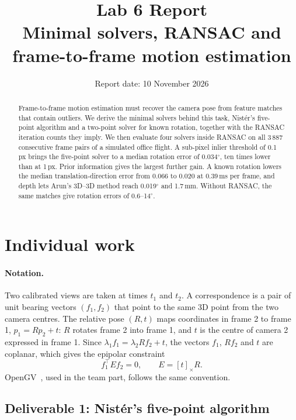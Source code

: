 \documentclass[11pt,a4paper]{article}
\title{Lab 6 Report\\[0.3em]\large Minimal solvers, RANSAC and frame-to-frame motion estimation}
\author{\studentname}
\date{Report date: 10 November 2026}
\newcommand{\skewm}[1]{[#1]_{\times}}
\begin{document}
\maketitle

\begin{abstract}
Frame-to-frame motion estimation must recover the camera pose from feature matches
that contain outliers. We derive the minimal solvers behind this task, Nist\'er's
five-point algorithm and a two-point solver for known rotation, together with the
RANSAC iteration counts they imply. We then evaluate four solvers inside RANSAC on all
3\,887 consecutive frame pairs of a simulated office flight. A sub-pixel inlier
threshold of 0.1\,px brings the five-point solver to a median rotation error of
0.034$^\circ$, ten times lower than at 1\,px. Prior information gives the largest
further gain. A known rotation lowers the median translation-direction error from
0.066 to 0.020 at 0.39\,ms per frame, and depth lets Arun's 3D--3D method reach
0.019$^\circ$ and 1.7\,mm. Without RANSAC, the same matches give rotation errors of
0.6--14$^\circ$.
\end{abstract}

\section{Individual work}

\paragraph{Notation.}
Two calibrated views are taken at times $t_1$ and $t_2$. A correspondence is a pair of
unit bearing vectors $(f_1, f_2)$ that point to the same 3D point from the two camera
centres. The relative pose $(R, t)$ maps coordinates in frame 2 to frame 1,
$p_1 = R p_2 + t$: $R$ rotates frame 2 into frame 1, and $t$ is the centre of camera 2
expressed in frame 1. Since $\lambda_1 f_1 = \lambda_2 R f_2 + t$, the vectors $f_1$,
$R f_2$ and $t$ are coplanar, which gives the epipolar constraint
\begin{equation}
  f_1^\top E f_2 = 0, \qquad E = \skewm{t} R .
  \label{eq:epipolar}
\end{equation}
OpenGV~\cite{kneip2014opengv}, used in the team part, follows the same convention.

\subsection{Deliverable 1: Nist\'er's five-point algorithm}
\end{document}
